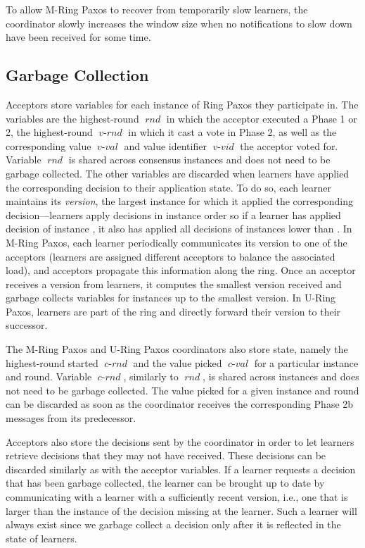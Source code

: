 \documentclass[final,3p,times,twocolumn,authoryear]{elsarticle}
\newcommand{\mv}[1]{\ensuremath{\operatorname{\mathit{#1}}}}
\begin{document}
To allow M-Ring Paxos to recover from temporarily slow learners, the coordinator slowly increases the window size when no notifications to slow down have been received for some time.


\subsection{Garbage Collection}
\label{sec:gc}

Acceptors store variables for each instance of Ring Paxos they participate in. The variables are the highest-round \mv{rnd} in which the acceptor executed a Phase 1 or 2, the highest-round \mv{v-rnd} in which it cast a vote in Phase 2, as well as the corresponding value \mv{v-val} and value identifier \mv{v-vid} the acceptor voted for.  Variable \mv{rnd} is shared across consensus instances and does not need to be garbage collected.  The other variables are discarded when  learners have applied the corresponding decision to their application state.  To do so, each learner maintains its \emph{version}, the largest instance for which it applied the corresponding decision---learners apply decisions in instance order so if a learner has applied decision of instance , it also has applied all decisions of instances lower than .  In M-Ring Paxos, each learner periodically communicates its version to one of the acceptors (learners are assigned different acceptors to balance the associated load), and acceptors propagate this information along the ring.  Once an acceptor receives a version from  learners, it computes the smallest version received and garbage collects variables for instances up to the smallest version.  In U-Ring Paxos, learners are part of the ring and directly forward their version to their successor.

The M-Ring Paxos and U-Ring Paxos coordinators also store state, namely the highest-round started \mv{c-rnd} and the value picked \mv{c-val} for a particular instance and round.  Variable \mv{c-rnd}, similarly to \mv{rnd}, is shared across instances and does not need to be garbage collected.  The value picked for a given instance and round can be discarded as soon as the coordinator receives the corresponding Phase 2b messages from its predecessor.

Acceptors also store the decisions sent by the coordinator in order to let learners retrieve decisions that they may not have received.  These decisions can be discarded similarly as with the acceptor variables.  If a learner requests a decision that has been garbage collected, the learner can be brought up to date by communicating with a learner with a sufficiently recent version, i.e., one that is larger than the instance of the decision missing at the learner.  Such a learner will always exist since we garbage collect a decision only after it is reflected in the state of  learners.
\end{document}
